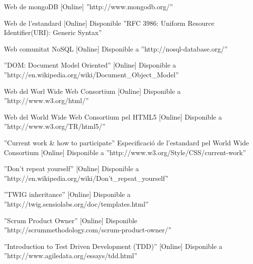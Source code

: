 \begin{thebibliography}{100}
 Web de mongoDB [Online] ''http://www.mongodb.org/''

 Web de l'estandard [Online] Disponible ''RFC 3986: Uniform Resource Identifier(URI): Generic Syntax''

 Web comunitat NoSQL [Online] Disponible a ''http://nosql-database.org/''

 ''DOM: Document Model Oriented'' [Online] Disponible a ''http://en.wikipedia.org/wiki/Document\_Object\_Model''

 Web del Worl Wide Web Consortium [Online] Disponible a ''http://www.w3.org/html/''

 Web del World Wide Web Consortium pel HTML5 [Online] Disponible a ''http://www.w3.org/TR/html5/''

 ''Current work & how to participate'' Especificació de l'estandard pel World Wide Consortium [Online] Disponible a ''http://www.w3.org/Style/CSS/current-work''

 ''Don't repeat yourself'' [Online] Disponible a ''http://en.wikipedia.org/wiki/Don't\_repeat\_yourself''

 ''TWIG inheritance'' [Online] Disponible a ''http://twig.sensiolabs.org/doc/templates.html''

 ''Scrum Product Owner'' [Online] Disponible ''http://scrummethodology.com/scrum-product-owner/''

 ''Introduction to Test Driven Development (TDD)'' [Online] Disponible a ''http://www.agiledata.org/essays/tdd.html''
\end{thebibliography}